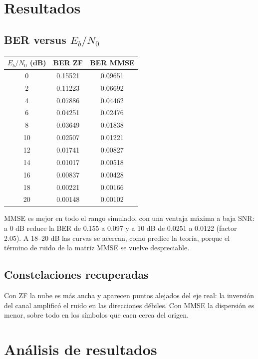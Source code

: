 \documentclass[11pt,a4paper]{article}
\begin{document}
\section{Resultados}

\subsection{BER versus $E_b/N_0$}

\begin{tabular}{@{}ccc@{}}
  \toprule
  $E_b/N_0$ (dB) & BER ZF & BER MMSE \\
  \midrule
  0  & 0.15521 & 0.09651 \\
  2  & 0.11223 & 0.06692 \\
  4  & 0.07886 & 0.04462 \\
  6  & 0.04251 & 0.02476 \\
  8  & 0.03649 & 0.01838 \\
  10 & 0.02507 & 0.01221 \\
  12 & 0.01741 & 0.00827 \\
  14 & 0.01017 & 0.00518 \\
  16 & 0.00837 & 0.00428 \\
  18 & 0.00221 & 0.00166 \\
  20 & 0.00148 & 0.00102 \\
  \bottomrule
\end{tabular}


MMSE es mejor en todo el rango simulado, con una ventaja máxima a baja SNR: a 0 dB reduce
la BER de 0.155 a 0.097 y a 10 dB de 0.0251 a 0.0122 (factor 2.05). A 18--20 dB las curvas
se acercan, como predice la teoría, porque el término de ruido de la matriz MMSE se vuelve
despreciable.

\subsection{Constelaciones recuperadas}


Con ZF la nube es más ancha y aparecen puntos alejados del eje real: la inversión del canal
amplificó el ruido en las direcciones débiles. Con MMSE la dispersión es menor, sobre todo
en los símbolos que caen cerca del origen.

\section{Análisis de resultados}
\end{document}
